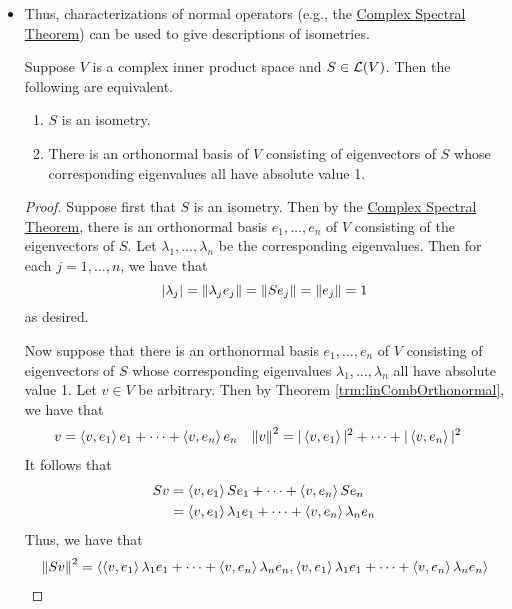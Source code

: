 \documentclass[../main.tex]{subfiles}
\begin{document}
\begin{itemize}
    \item Thus, characterizations of normal operators (e.g., the \hyperref[trm:ComplexSpectral]{Complex Spectral Theorem}) can be used to give descriptions of isometries.
    \begin{theorem}
        Suppose $V$ is a complex inner product space and $S\in\mathcal{L}(V)$. Then the following are equivalent.
        \begin{enumerate}[label={\textup{(}\alph*\textup{)}}]
            \item $S$ is an isometry.
            \item There is an orthonormal basis of $V$ consisting of eigenvectors of $S$ whose corresponding eigenvalues all have absolute value 1.
        \end{enumerate}
        \begin{proof}
            Suppose first that $S$ is an isometry. Then by the \hyperref[trm:ComplexSpectral]{Complex Spectral Theorem}, there is an orthonormal basis $e_1,\dots,e_n$ of $V$ consisting of the eigenvectors of $S$. Let $\lambda_1,\dots,\lambda_n$ be the corresponding eigenvalues. Then for each $j=1,\dots,n$, we have that
            \begin{equation*}
                |\lambda_j| = \norm{\lambda_je_j} = \norm{Se_j} = \norm{e_j} = 1
            \end{equation*}
            as desired.\par
            Now suppose that there is an orthonormal basis $e_1,\dots,e_n$ of $V$ consisting of eigenvectors of $S$ whose corresponding eigenvalues $\lambda_1,\dots,\lambda_n$ all have absolute value 1. Let $v\in V$ be arbitrary. Then by Theorem \ref{trm:linCombOrthonormal}, we have that
            \begin{align*}
                v &= \left\langle{v},{e_1}\right\rangle e_1+\cdots+\left\langle{v},{e_n}\right\rangle e_n&
                \norm{v}^2 &= |\left\langle{v},{e_1}\right\rangle|^2+\cdots+|\left\langle{v},{e_n}\right\rangle|^2
            \end{align*}
            It follows that
            \begin{align*}
                Sv &= \left\langle{v},{e_1}\right\rangle Se_1+\cdots+\left\langle{v},{e_n}\right\rangle Se_n\\
                &= \left\langle{v},{e_1}\right\rangle\lambda_1e_1+\cdots+\left\langle{v},{e_n}\right\rangle\lambda_ne_n
            \end{align*}
            Thus, we have that
            \begin{align*}
                \norm{Sv}^2 &= \inp{\inp{v}{e_1}\lambda_1e_1+\cdots+\inp{v}{e_n}\lambda_ne_n}{\inp{v}{e_1}\lambda_1e_1+\cdots+\inp{v}{e_n}\lambda_ne_n}\\

\end{align*}
\end{proof}
\end{theorem}
\end{itemize}
\end{document}

